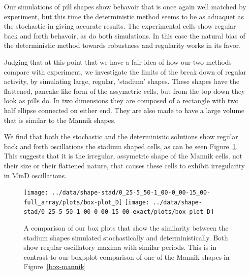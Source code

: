 \documentclass[letterpaper,twocolumn,amsmath,amssymb,pre]{revtex4-1}
\begin{document}
Our simulations of pill shapes show behavoir that is once again well
matched by experiment, but this time the deterministic method seems to
be as aduaquet as the stochastic in giving accurate results.  The
experimental cells show regular back and forth behavoir, as do both
simulations.  In this case the natural bias of the deterministic
method towards robustness and regularity works in its favor.

Judging that at this point that we have a fair idea of how our two
methods compare with experiment, we investigate the limits of the
break down of regular activity, by simulating large, regular,
'stadium' shapes.  These shapes have the flattened, pancake like form
of the assymetric cells, but from the top down they look as pills
do. In two dimensions they are composed of a rectangle with two half
ellipse connected on either end.  They are also made to have a large
volume that is similar to the Mannik shapes.

We find that both the stochastic and the deterministic solutions show
regular back and forth oscillations the stadium shaped cells, as can
be seen Figure~\ref{box-stadium}.  This suggests that it is the irregular,
assymetric shape of the Mannik cells, not their size or their
flattened nature, that causes these cells to exhibit irregularity in
MinD oscillations.

\begin{figure}
  \texttt{[image: ../data/shape-stad/0\_25-5\_50-1\_00-0\_00-15\_00-full\_array/plots/box-plot\_D]}
  \texttt{[image: ../data/shape-stad/0\_25-5\_50-1\_00-0\_00-15\_00-exact/plots/box-plot\_D]}
  \caption{A comparison of our box plots that show the similarity
    between the stadium shapes simulated stochastically and
    deterministically.  Both show regular oscillatory maxima with
    similar periods.  This is in contrast to our boxpplot comparison
    of one of the Mannik shapes in Figure~\ref{box-mannik}}
  \label{box-stadium}
\end{figure}
\end{document}
